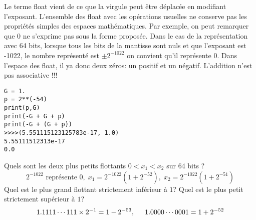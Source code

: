 Le terme float vient de ce que la virgule peut être déplacée en modifiant l'exposant.\newline
L'ensemble des float avec les opérations usuelles ne conserve pas les propriétés simples des espaces mathématiques.\newline
Par exemple, on peut remarquer que $0$ ne s'exprime pas sous la forme proposée. Dans le cas de la représentation avec 64 bits, lorsque tous les bits de la mantisse sont nuls et que l'exposant est -1022, le nombre représenté est $\pm 2^{-1022}$ on convient qu'il représente $0$. Dans l'espace des float, il ya donc deux zéros: un positif et un négatif.\newline
L'addition n'est pas associative !!!
\begin{verbatim}
G = 1.
p = 2**(-54)
print(p,G)
print(-G + G + p)
print(-G + (G + p))
>>>>(5.551115123125783e-17, 1.0)
5.55111512313e-17
0.0
\end{verbatim}
Quels sont les deux plus petits flottants $0<x_1<x_2$ sur 64 bits ?
\begin{displaymath}
   2^{-1022}\text{ représente }0,\; x_1 = 2^{-1022}(1 + 2^{-52}),\; x_2=2^{-1022}(1 + 2^{-51})  
\end{displaymath}
Quel est le plus grand flottant strictement inférieur à $1$? Quel est le plus petit strictement supérieur à $1$?
\begin{displaymath}
  1.1111\cdots 111 \times 2^{-1} = 1 -2^{-53},\hspace{0.5cm} 1.0000 \cdots 0001 = 1+2^{-52}
\end{displaymath}


